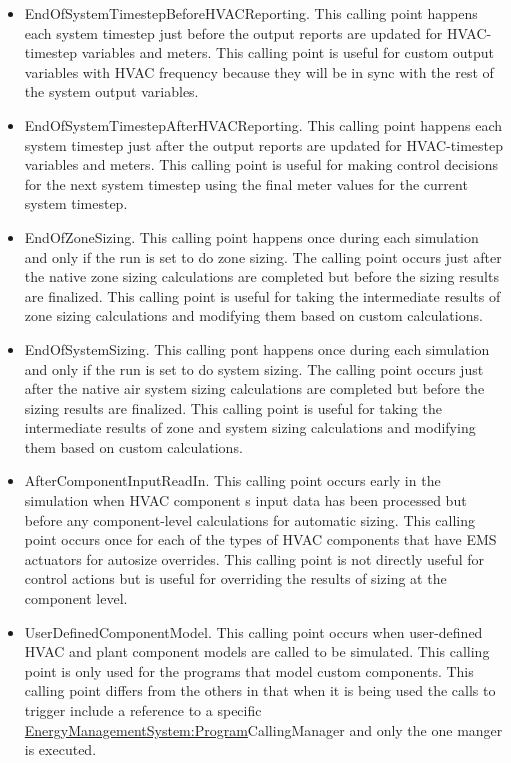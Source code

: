 \begin{itemize}
\item
  EndOfSystemTimestepBeforeHVACReporting. This calling point happens each system timestep just before the output reports are updated for HVAC-timestep variables and meters. This calling point is useful for custom output variables with HVAC frequency because they will be in sync with the rest of the system output variables.
\item
  EndOfSystemTimestepAfterHVACReporting. This calling point happens each system timestep just after the output reports are updated for HVAC-timestep variables and meters. This calling point is useful for making control decisions for the next system timestep using the final meter values for the current system timestep.
\item
  EndOfZoneSizing. This calling point happens once during each simulation and only if the run is set to do zone sizing. The calling point occurs just after the native zone sizing calculations are completed but before the sizing results are finalized. This calling point is useful for taking the intermediate results of zone sizing calculations and modifying them based on custom calculations.
\item
  EndOfSystemSizing. This calling pont happens once during each simulation and only if the run is set to do system sizing. The calling point occurs just after the native air system sizing calculations are completed but before the sizing results are finalized. This calling point is useful for taking the intermediate results of zone and system sizing calculations and modifying them based on custom calculations.
\item
  AfterComponentInputReadIn. This calling point occurs early in the simulation when HVAC component s input data has been processed but before any component-level calculations for automatic sizing. This calling point occurs once for each of the types of HVAC components that have EMS actuators for autosize overrides. This calling point is not directly useful for control actions but is useful for overriding the results of sizing at the component level.
\item
  UserDefinedComponentModel. This calling point occurs when user-defined HVAC and plant component models are called to be simulated. This calling point is only used for the programs that model custom components. This calling point differs from the others in that when it is being used the calls to trigger include a reference to a specific \hyperref[energymanagementsystemprogram]{EnergyManagementSystem:Program}CallingManager and only the one manger is executed.

\end{itemize}
